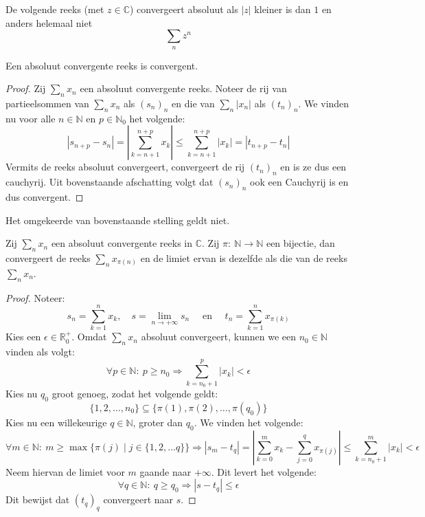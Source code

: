 \documentclass[main.tex]{subfiles}
\begin{document}
\begin{vb}
  De volgende reeks (met $z\in \mathbb{C}$) convergeert absoluut als $|z|$ kleiner is dan $1$ en anders helemaal niet
  \[ \sum_{n}z^{n} \]
\end{vb}

\begin{bpr}
  Een absoluut convergente reeks is convergent.

  \begin{proof}
    Zij $\sum_{n}x_{n}$ een absoluut convergente reeks.
    Noteer de rij van partieelsommen van $\sum_{n}x_{n}$ als $(s_{n})_{n}$ en die van $\sum_{n}|x_{n}|$ als $(t_{n})_{n}$.
    We vinden nu voor alle $n\in \mathbb{N}$ en $p\in \mathbb{N}_{0}$ het volgende:
    \[
    |s_{n+p} - s_{n}|
    = \left| \sum_{k=n+1}^{n+p}x_{k} \right|
    \le \sum_{k=n+1}^{n+p}|x_{k}|
    = |t_{n+p}-t_{n}|
    \]
    Vermits de reeks absoluut convergeert, convergeert de rij $(t_{n})_{n}$ en is ze dus een cauchyrij.
    Uit bovenstaande afschatting volgt dat $(s_{n})_{n}$ ook een Cauchyrij is en dus convergent.
  \end{proof}
\end{bpr}

\begin{tvb}
  Het omgekeerde van bovenstaande stelling geldt niet.
\end{tvb}

\begin{bst}
  Zij $\sum_{n}x_{n}$ een absoluut convergente reeks in $\mathbb{C}$.
  Zij $\pi:\ \mathbb{N} \rightarrow \mathbb{N}$ een bijectie, dan convergeert de reeks $\sum_{n}x_{\pi(n)}$ en de limiet ervan is dezelfde als die van de reeks $\sum_{n}x_{n}$.

  \begin{proof}
    Noteer:
    \[
    s_{n} = \sum_{k=1}^{n}x_{k},\quad
    s=\lim_{n\rightarrow +\infty}s_{n}\quad
    \text{ en }\quad
    t_{n} = \sum_{k=1}^{n}x_{\pi(k)}
    \]
    Kies een $\epsilon \in \mathbb{R}_{0}^{+}$.
    Omdat $\sum_{n}x_{n}$ absoluut convergeert, kunnen we een $n_{0}\in \mathbb{N}$ vinden als volgt:
    \[ \forall p\in \mathbb{N}:\ p \ge n_{0}\Rightarrow \sum_{k=n_{0}+1}^{p}|x_{k}| < \epsilon \]
    Kies nu $q_{0}$ groot genoeg, zodat het volgende geldt:
    \[ \{ 1,2,\dotsc,n_{0} \} \subseteq \{ \pi(1), \pi(2), \dotsc, \pi(q_{0}) \} \]
    Kies nu een willekeurige $q\in \mathbb{N}$, groter dan $q_{0}$.
    We vinden het volgende:
    \[ \forall m\in \mathbb{N}:\ m\ge \max\{\pi(j)\mid j\in \{1,2,\dotsc q\} \} \Rightarrow |s_{m}-t_{q}| = \left| \sum_{k=0}^{m}x_{k} - \sum_{j=0}^{q}x_{\pi(j)}\right| \le \sum_{k=n_{0}+1}^{m}|x_{k}| < \epsilon \]
    Neem hiervan de limiet voor $m$ gaande naar $+\infty$.
    Dit levert het volgende:
    \[ \forall q\in \mathbb{N}:\ q \ge q_{0} \Rightarrow |s-t_{q}| \le \epsilon \]
    Dit bewijst dat $(t_{q})_{q}$ convergeert naar $s$.
  \end{proof}
\end{bst}
\end{document}
